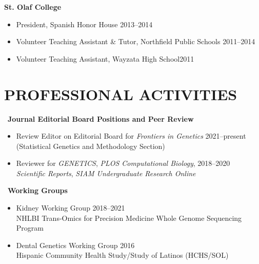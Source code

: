 \documentclass[margin]{res}
\begin{document}
\begin{resume}
			\textbf{St. Olaf College}
			\begin{itemize} \itemsep -2pt
			\item President, Spanish Honor House \hfill 2013--2014
			\item Volunteer Teaching Assistant \& Tutor, Northfield Public Schools \hfill 2011--2014
			\item Volunteer Teaching Assistant, Wayzata High School\hfill 2011 \\
			\end{itemize}
						
\section{PROFESSIONAL ACTIVITIES} 
	\ \textbf{Journal Editorial Board Positions and Peer Review} 
	\begin{itemize} \itemsep -2pt 
	\item Review Editor on Editorial Board for \textit{Frontiers in Genetics}  \hfill 2021--present \\ (Statistical Genetics and Methodology Section) 
	\item Reviewer for \textit{GENETICS}, \textit{PLOS Computational Biology}, \hfill 2018--2020 \\  \textit{Scientific Reports}, \textit{SIAM Undergraduate Research Online}
	\end{itemize} %
	
	\ \textbf{Working Groups} 
	\begin{itemize} \itemsep -2pt
	\item Kidney Working Group \hfill 2018--2021 \\ NHLBI Trans-Omics for Precision Medicine Whole Genome Sequencing Program 
	\item Dental Genetics Working Group \hfill 2016 \\ Hispanic Community Health Study/Study of Latinos (HCHS/SOL)
	\end{itemize}
	

\end{resume}
\end{document}
